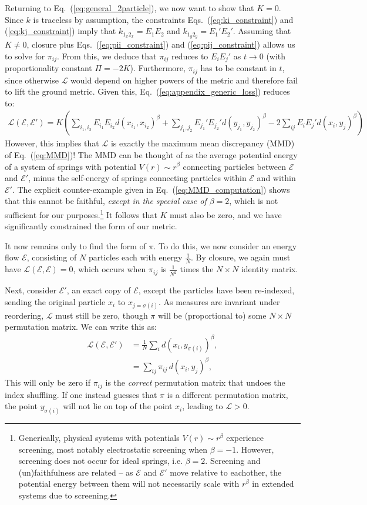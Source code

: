 \documentclass[letterpaper,11pt]{article}
\newcommand{\E}{\mathcal{E}}
\DeclareRobustCommand{\Eq}[1]{Eq.~(\ref{eq:#1})}
\DeclareRobustCommand{\Eqs}[2]{Eqs.~(\ref{eq:#1}) and (\ref{eq:#2})}
\begin{document}
Returning to \Eq{general_2particle},  we now want to show that $K=0$.
%
Since $k$ is traceless by assumption, the constraints \Eqs{ki_constraint}{kj_constraint} imply that $k_{1_x2_x} = E_1 E_2$ and $k_{1_y2_y} = E_1' E_2'$. Assuming that $K \neq 0$, closure plus \Eqs{pii_constraint}{pij_constraint} allows us to solve for $\pi_{ij}$. From this, we deduce that $\pi_{ij}$ reduces to $E_i E_j'$ as $t \to 0$ (with proportionality constant $\Pi = -2K$). Furthermore, $\pi_{ij}$ has to be constant in $t$, since otherwise $\mathcal{L}$ would depend on higher powers of the metric and therefore fail to lift the ground metric. Given this, \Eq{appendix_generic_loss} reduces to:
%
\begin{align}
    \mathcal{L}(\E,\E') = K\left(\sum_{i_1,i_2}E_{i_1}E_{i_2}d(x_{i_1},x_{i_2})^\beta  + \sum_{j_1,j_2}E_{j_1}'E_{j_2}'d(y_{j_1},y_{j_2})^\beta - 2\sum_{ij}E_iE_j'd(x_i,y_j)^\beta\right)
\end{align}
%
However, this implies that $\mathcal{L}$ is exactly the maximum mean discrepancy (MMD) of \Eq{MMD}! 
The MMD can be thought of as the average potential energy of a system of springs with potential $V(r) \sim r^\beta$ connecting particles between $\E$ and $\E'$, minus the self-energy of springs connecting particles within $\E$ and within $\E'$.
The explicit counter-example given in \Eq{MMD_computation} shows that this cannot be faithful, \emph{except in the special case of $\beta = 2$}, which is not sufficient for our purposes.\footnote{Generically, physical systems with potentials $V(r) \sim r^\beta$ experience screening, most notably electrostatic screening when $\beta = -1$. However, screening does not occur for ideal springs, i.e. $\beta = 2$. Screening and (un)faithfulness are related -- as $\E$ and $\E'$ move relative to eachother, the potential energy between them will not necessarily scale with $r^\beta$ in extended systems due to screening.} It follows that $K$ must also be zero, and we have significantly constrained the form of our metric.

It now remains only to find the form of $\pi$. To do this, we now consider an energy flow $\E$, consisting of $N$ particles each with energy $\frac{1}{N}$. By closure, we again must have $\mathcal{L}(\E,\E)  = 0$, which occurs when $\pi_{ij}$ is $\frac{1}{N^2}$ times the $N\times N$ identity matrix. 
%

Next, consider $\E'$, an exact copy of $\E$, except the particles have been re-indexed, sending the original particle $x_i$ to $x_{j = \sigma(i)}$. As measures are invariant under reordering, $\mathcal{L}$ must still be zero, though $\pi$ will be (proportional to) some $N\times N$ permutation matrix.  We can write this as:
%
\begin{align}
    \mathcal{L}(\E, \E') &= \frac{1}{N}\sum_i d(x_i, y_{\sigma(i)})^\beta, \nonumber \\
    &= \sum_{ij} \pi_{ij} \, d(x_i, y_j)^\beta,
\end{align}
%
This will only be zero if $\pi_{ij}$ is the \emph{correct} permutation matrix that undoes the index shuffling. If one instead guesses that $\pi$ is a different permutation matrix, the point $y_{\sigma(i)}$ will not lie on top of the point $x_i$, leading to $\mathcal{L} > 0$.
\end{document}
